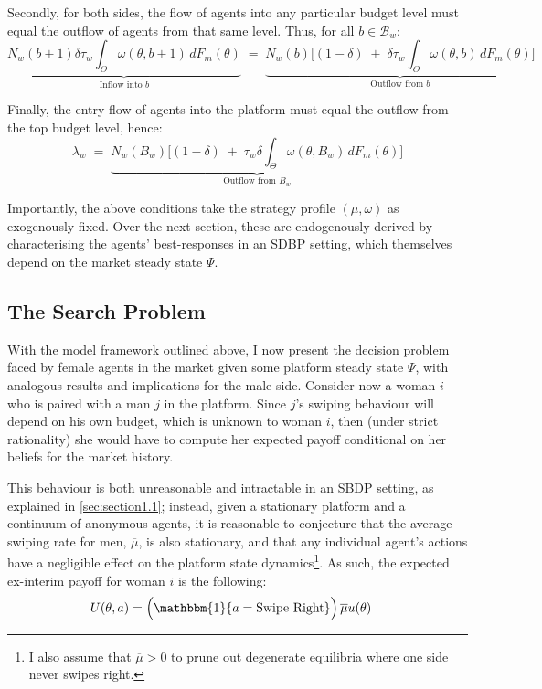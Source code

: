 Secondly, for both sides, the flow of agents into any particular budget level must equal the outflow of agents from that same level. Thus, for all $b\in\mathcal{B}_w$: 
\begin{equation}\label{eq:ss2} 
    \underbrace{N_w(b+1) \delta \tau_w \int_{\Theta} \omega(\theta,b+1)\,dF_{m}(\theta)}_{\text{Inflow into $b$}} \;=\; \underbrace{N_w(b) \Big[ (1-\delta) \;+\; \delta \tau_w\int_{\Theta} \omega(\theta,b)\,dF_{m}(\theta)\Big]}_{\text{Outflow from $b$}}
\end{equation}

Finally, the entry flow of agents into the platform must equal the outflow from the top budget level, hence: 
\begin{equation}\label{eq:ss3} 
    \lambda_w \;=\; \underbrace{N_w(B_w) \Big[ (1-\delta) \;+\; \tau_w \delta \int_{\Theta} \omega(\theta,B_w)\,dF_{m}(\theta) \Big]}_{\text{Outflow from $B_w$}}
\end{equation} 

Importantly, the above conditions take the strategy profile $(\mu,\omega)$ as exogenously fixed. Over the next section, these are endogenously derived by characterising the agents’ best-responses in an SDBP setting, which themselves depend on the market steady state $\Psi$.

\subsection{The Search Problem}\label{sec:section2.3}
With the model framework outlined above, I now present the decision problem faced by female agents in the market given some platform steady state $\Psi$, with analogous results and implications for the male side. 
Consider now a woman $i$ who is paired with a man $j$ in the platform. Since $j$'s swiping behaviour will depend on his own budget, which is unknown to woman $i$, then (under strict rationality) she would have to compute her expected payoff conditional on her beliefs for the market history.

This behaviour is both unreasonable and intractable in an SBDP setting, as explained in \autoref{sec:section1.1}; instead, given a stationary platform and a continuum of anonymous agents, it is reasonable to conjecture that the average swiping rate for men, $\overline\mu$, is also stationary, and that any individual agent's actions have a negligible effect on the platform state dynamics\footnote{I also assume that $\overline\mu>0$ to prune out degenerate equilibria where one side never swipes right.}.
As such, the expected ex-interim payoff for woman $i$ is the following:
\begin{equation*}
    \begin{aligned}
        U(\theta, a)&=\Big(\mathbbm{1}\{a=\text{Swipe Right}\}\Big)\,\overline{\mu}u(\theta)%
    \end{aligned} 
\end{equation*} 


